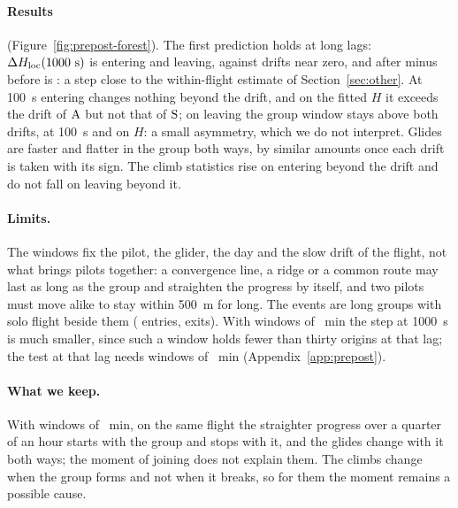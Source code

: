 \paragraph{Results} (Figure~\ref{fig:prepost-forest}). The first prediction holds at long lags:
$\Delta H_\mathrm{loc}(1000~\mathrm{s})$ is \PPEntryDHloc{} entering and \PPExitDHloc{} leaving, against drifts
near zero, and after minus before is \PPAfterBeforeDHloc: a step close to the within-flight estimate
of Section~\ref{sec:other}. At 100~s entering changes nothing beyond the drift, and on the fitted $H$
it exceeds the drift of $\mathrm{A}$ but not that of $\mathrm{S}$; on leaving the group window stays above both
drifts, at 100~s and on $H$: a small asymmetry, which we do not interpret. Glides are faster and flatter in the group both ways, by similar amounts once each drift
is taken with its sign. The climb statistics rise on entering beyond the drift and do not fall on
leaving beyond it.

\paragraph{Limits.} The windows fix the pilot, the glider, the day and the slow drift of the flight,
not what brings pilots together: a convergence line, a ridge or a common route may last as long as
the group and straighten the progress by itself, and two pilots must move alike to stay within
500~m for long. The events are long groups with solo flight beside them (\PPEntryEvents{} entries,
\PPExitEvents{} exits). With windows of \PPShortWindowMin~min the step at 1000~s is much smaller,
since such a window holds fewer than thirty origins at that lag; the test at that lag needs windows of
\PPWindowMin~min (Appendix~\ref{app:prepost}).

\paragraph{What we keep.} With windows of \PPWindowMin~min, on the same flight the straighter
progress over a quarter of an hour starts with the group and stops with it, and the glides change
with it both ways; the moment of joining does not explain them. The climbs change when the group
forms and not when it breaks, so for them the moment remains a possible cause.
